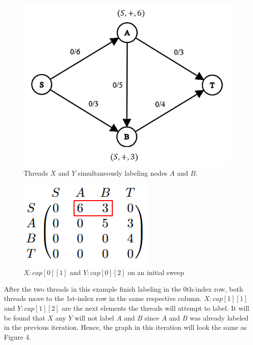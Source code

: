         \begin{figure}[H]
            \centering
            \includegraphics[scale=.5]{figures/nodeAandB.png}
            \caption{Threads $X$ and $Y$ simultaneously labeling nodes $A$ and $B$.}
            \label{fig:Sweep}
        \end{figure}
        \begin{figure}[H]
            \centering
            \includegraphics[scale=.5]{figures/Sweep.png}
            \caption{$X:cap[0][1]$ and $Y:cap[0][2]$ on an initial sweep}
            \label{fig:Sweep}
        \end{figure}
        
        After the two threads in this example finish labeling in the 0th-index row, both threads move to the 1st-index row in the same respective column. $X:cap[1][1]$ and $Y:cap[1][2]$ are the next elements the threads will attempt to label. It will be found that $X$ any $Y$ will not label $A$ and $B$ since $A$ and $B$ was already labeled in the previous iteration.
        Hence, the graph in this iteration will look the same as Figure 4.
        
